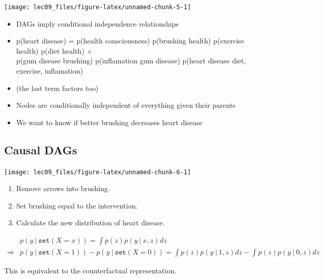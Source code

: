 \documentclass[]{article}
\providecommand{\tightlist}{%
  \setlength{\itemsep}{0pt}\setlength{\parskip}{0pt}}
\begin{document}
\begin{center}\texttt{[image: lec09\_files/figure-latex/unnamed-chunk-5-1]} \end{center}

\begin{itemize}
\item
  DAGs imply conditional independence relationships
\item
  p(heart disease) = p(health consciousness) p(brushing \textbar{}
  health) p(exercise \textbar{} health) p(diet \textbar{} health)
  \(\times\)\\
  p(gum disease \textbar{} brushing) p(inflamation \textbar{} gum
  disease) p(heart disease \textbar{} diet, exercise, inflamation)
\item
  (the last term factors too)
\item
  Nodes are conditionally independent of everything given their parents
\item
  We want to know if better brushing decreases heart disease
\end{itemize}

\hypertarget{causal-dags}{%
\subsection{Causal DAGs}\label{causal-dags}}

\begin{center}\texttt{[image: lec09\_files/figure-latex/unnamed-chunk-6-1]} \end{center}

\begin{enumerate}
\def\labelenumi{\arabic{enumi}.}
\tightlist
\item
  Remove arrows into brushing.\\
\item
  Set brushing equal to the intervention.\\
\item
  Calculate the new distribution of heart disease.
\end{enumerate}

\[
\begin{aligned}
& p(y \ \vert\ \texttt{set}(X=x)) = \int p(z)p(y\ \vert\ x,z)dz\\
\Rightarrow & p(y \ \vert\ \texttt{set}(X=1)) - p(y \ \vert\ \texttt{set}(X=0)) = \int p(z)p(y\ \vert\ 1,z)dz - \int p(z)p(y\ \vert\ 0,z)dz
\end{aligned}
\]

This is equivalent to the counterfactual representation.
\end{document}
